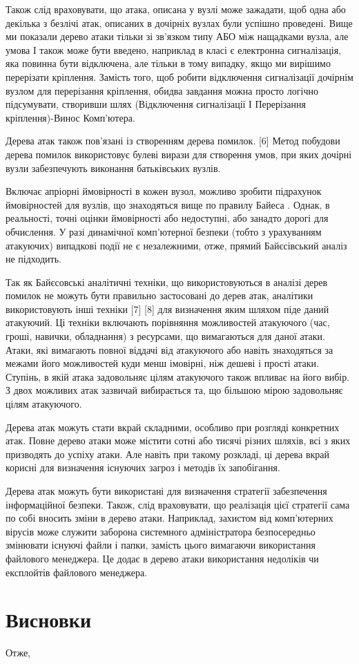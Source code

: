 Також слід враховувати, що атака, описана у вузлі може зажадати, щоб одна або декілька з безлічі атак, описаних в дочірніх вузлах були успішно проведені. Вище ми показали дерево атаки тільки зі зв'язком типу АБО між нащадками вузла, але умова І також може бути введено, наприклад в класі є електронна сигналізація, яка повинна бути відключена, але тільки в тому випадку, якщо ми вирішимо перерізати кріплення. Замість того, щоб робити відключення сигналізації дочірнім вузлом для перерізання кріплення, обидва завдання можна просто логічно підсумувати, створивши шлях (Відключення сигналізації І Перерізання кріплення)-Винос Комп'ютера.

Дерева атак також пов'язані із створенням дерева помилок. {[}6{]} Метод побудови дерева помилок використовує булеві вирази для створення умов, при яких дочірні вузли забезпечують виконання батьківських вузлів.

Включає апріорні ймовірності в кожен вузол, можливо зробити підрахунок ймовірностей для вузлів, що знаходяться вище по правилу Байеса . Однак, в реальності, точні оцінки ймовірності або недоступні, або занадто дорогі для обчислення. У разі динамічної комп'ютерної безпеки (тобто з урахуванням атакуючих) випадкові події не є незалежними, отже, прямий Байєсівський аналіз не підходить.

Так як Байєсовські аналітичні техніки, що використовуються в аналізі дерев помилок не можуть бути правильно застосовані до дерев атак, аналітики використовують інші техніки {[}7{]} {[}8{]} для визначення яким шляхом піде даний атакуючий. Ці техніки включають порівняння можливостей атакуючого (час, гроші, навички, обладнання) з ресурсами, що вимагаються для даної атаки. Атаки, які вимагають повної віддачі від атакуючого або навіть знаходяться за межами його можливостей куди менш імовірні, ніж дешеві і прості атаки. Ступінь, в якій атака задовольняє цілям атакуючого також впливає на його вибір. З двох можливих атак зазвичай вибирається та, що більшою мірою задовольняє цілям атакуючого.

Дерева атак можуть стати вкрай складними, особливо при розгляді конкретних атак. Повне дерево атаки може містити сотні або тисячі різних шляхів, всі з яких призводять до успіху атаки. Але навіть при такому розкладі, ці дерева вкрай корисні для визначення існуючих загроз і методів їх запобігання.

Дерева атак можуть бути використані для визначення стратегії забезпечення інформаційної безпеки. Також, слід враховувати, що реалізація цієї стратегії сама по собі вносить зміни в дерево атаки. Наприклад, захистом від комп'ютерних вірусів може служити заборона системного адміністратора безпосередньо змінювати існуючі файли і папки, замість цього вимагаючи використання файлового менеджера. Це додає в дерево атаки використання недоліків чи експлойтів файлового менеджера.

\section*{Висновки}
Отже,

